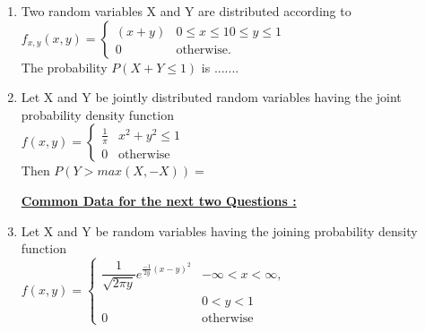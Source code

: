 \begin{enumerate}[label=\thesection.\arabic*.,ref=\thesection.\theenumi]
\begin{enumerate}
\begin{multicols}{4}
\end{multicols}
\end{enumerate}
\solution


\item Two random variables X and Y are distributed according to\\
{\centering $
f_{x,y}(x,y) = 
\begin{cases}
 (x+y) & 0 \leqslant x \leqslant 1   0 \leqslant y \leqslant 1 \\
 0 & \text{otherwise}.
 \end{cases}
 $ \\}
The probability $P(X+Y \leqslant 1)$ is .......
%


\item Let X and Y be jointly distributed random variables having the joint probability density function \\
$
f(x,y) = 
\begin{cases} 
\frac{1}{\pi} 
&  x^2+y^2 \leqslant 1 \\
0 & \text{otherwise}
\end{cases}
$ \\
Then $P(Y>max(X,-X))=$

\begin{enumerate}
\end{enumerate}
\solution


\begin{center}
    \centering\underline{\textbf{Common Data for the next two Questions :}}
    \end{center}
    
\item     Let X and Y be random variables having the joining probability density function \\
    $
    f(x,y)=
    \begin{cases}
    {\dfrac{1}{\sqrt{2 \pi y}}}e^{\frac{-1}{2y}(x-y)^2}
    & -\infty < x < \infty,\\  
    &  0 < y < 1
    \\
    0 & \text{otherwise}
    \end{cases}
    $ \\
    

\end{enumerate}
